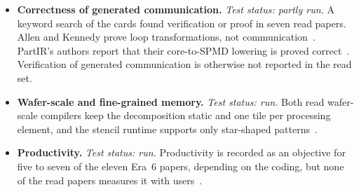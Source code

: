 \begin{itemize}[leftmargin=*,nosep]
  \item \textbf{Correctness of generated communication.} \emph{Test status: partly run.} A keyword search of the cards found verification or proof in seven read papers. Allen and Kennedy prove loop transformations, not communication~\cite{allen1987automatic}. PartIR's authors report that their core-to-SPMD lowering is proved correct~\cite{alabed2025partir}. Verification of generated communication is otherwise not reported in the read set.
  \item \textbf{Wafer-scale and fine-grained memory.} \emph{Test status: run.} Both read wafer-scale compilers keep the decomposition static and one tile per processing element, and the stencil runtime supports only star-shaped patterns~\cite{stawinoga2026mlir,rocki2020cerebras}.
  \item \textbf{Productivity.} \emph{Test status: run.} Productivity is recorded as an objective for five to seven of the eleven Era~6 papers, depending on the coding, but none of the read papers measures it with users~\cite{xu2021gspmd,alabed2025partir}.
\end{itemize}
